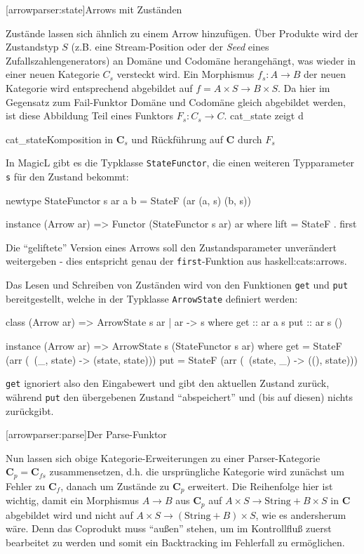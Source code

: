 \documentclass[11pt, a4paper, bibgerm]{scrbook}
\newcommand\icode[1]{\lstinline?#1?}
\newcommand\lsection{}
\newcommand\sref{}
\newcommand\abb{}
\newcommand\fig{}
\newcommand\ato{\rightarrow} %
\begin{document}
\lsection[arrowparser:state]{Arrows mit Zuständen}

Zustände lassen sich ähnlich zu einem Arrow hinzufügen. Über Produkte
wird der Zustandstyp $S$ (z.B. eine Stream-Position oder der
\textit{Seed} eines Zufallszahlengenerators) an Domäne und Codomäne
herangehängt, was wieder in einer neuen Kategorie $C_{s}$ versteckt
wird. Ein Morphismus $f_{s} : A \rightarrow B$ der neuen Kategorie wird
entsprechend abgebildet auf $f = A \times S \rightarrow B \times S$. Da
hier im Gegensatz zum Fail-Funktor Domäne und Codomäne gleich abgebildet
werden, ist diese Abbildung Teil eines Funktors $F_s: C_{s}
\ato C$. \abb{cat_state} zeigt d

\fig{cat_state}{Komposition in $\mathbf{C}_s$ und Rückführung auf
  $\mathbf{C}$ durch $F_s$}

In MagicL gibt es die Typklasse \icode{StateFunctor}, die einen weiteren
Typparameter \icode{s} für den Zustand bekommt:

\begin{code}
newtype StateFunctor s ar a b = StateF (ar (a, s) (b, s))

instance (Arrow ar) => Functor (StateFunctor s ar) ar where
    lift = StateF . first
\end{code} %

Die "`geliftete"' Version eines Arrows soll den Zustandsparameter
unverändert weitergeben - dies entspricht genau der
\icode{first}-Funktion aus \sref{haskell:cats:arrows}.

Das Lesen und Schreiben von Zuständen wird von den Funktionen \icode{get} und
\icode{put} bereitgestellt, welche in der Typklasse \icode{ArrowState}
definiert werden:

\begin{code}
class (Arrow ar) => ArrowState s ar | ar -> s where
  get :: ar a s
  put :: ar s ()

instance (Arrow ar) => ArrowState s (StateFunctor s ar)
  where
    get = StateF (arr (\ (_, state) -> (state, state)))
    put = StateF (arr (\ (state, _) -> ((), state)))
\end{code}

\icode{get} ignoriert also den Eingabewert und gibt den aktuellen
Zustand zurück, während \icode{put} den übergebenen Zustand
"`abspeichert"' und (bis auf diesen) nichts zurückgibt.

\lsection[arrowparser:parse]{Der Parse-Funktor}

Nun lassen sich obige Kategorie-Erweiterungen zu einer Parser-Kategorie
$\mathbf{C}_p = \mathbf{C}_{fs}$ zusammensetzen, d.h. die ursprüngliche
Kategorie wird zunächst um Fehler zu $\mathbf{C}_f$, danach um Zustände
zu $\mathbf{C}_p$ erweitert. Die Reihenfolge hier ist wichtig, damit ein
Morphismus $A \ato B$ aus $\mathbf{C}_p$ auf $A \times S \ato
\mathrm{String} + B \times S$ in $\mathbf{C}$ abgebildet wird und nicht
auf $A \times S \ato (\mathrm{String} + B) \times S$, wie es andersherum
wäre. Denn das Coprodukt muss "`außen"' stehen, um im Kontrollfluß
zuerst bearbeitet zu werden und somit ein Backtracking im Fehlerfall zu
ermöglichen.
\end{document}

